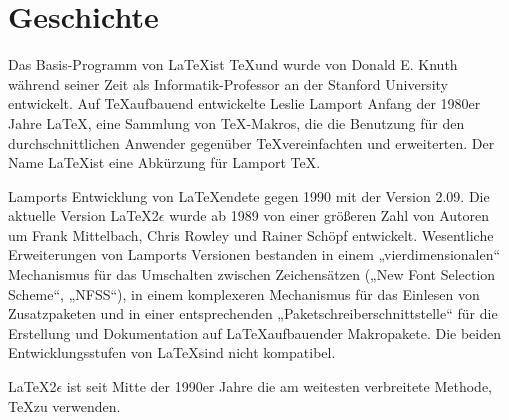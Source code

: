 
\chapter{Geschichte}

Das Basis-Programm von \LaTeX ist \TeX und wurde von Donald E. Knuth während seiner Zeit als Informatik-Professor an der Stanford University entwickelt. Auf \TeX aufbauend entwickelte Leslie Lamport Anfang der 1980er Jahre\cite{Lamport} \LaTeX, eine Sammlung von TeX-Makros, die die Benutzung für den durchschnittlichen Anwender gegenüber \TeX vereinfachten und erweiterten. Der Name \LaTeX ist eine Abkürzung für Lamport \TeX.

Lamports Entwicklung von \LaTeX endete gegen 1990 mit der Version 2.09.\cite{readme} Die aktuelle Version \LaTeX 2$\epsilon$ wurde ab 1989 von einer größeren Zahl von Autoren um Frank Mittelbach, Chris Rowley und Rainer Schöpf entwickelt.\cite{Mittelbach2010} Wesentliche Erweiterungen von Lamports Versionen bestanden in einem „vierdimensionalen“ Mechanismus für das Umschalten zwischen Zeichensätzen („New Font Selection Scheme“, „NFSS“), in einem komplexeren Mechanismus für das Einlesen von Zusatzpaketen und in einer entsprechenden „Paketschreiberschnittstelle“ für die Erstellung und Dokumentation auf \LaTeX aufbauender Makropakete.\cite{usrguide} Die beiden Entwicklungsstufen von \LaTeX sind nicht kompatibel.

\LaTeX 2$\epsilon$ ist seit Mitte der 1990er Jahre die am weitesten verbreitete Methode, \TeX zu verwenden\cite{TeX}.
